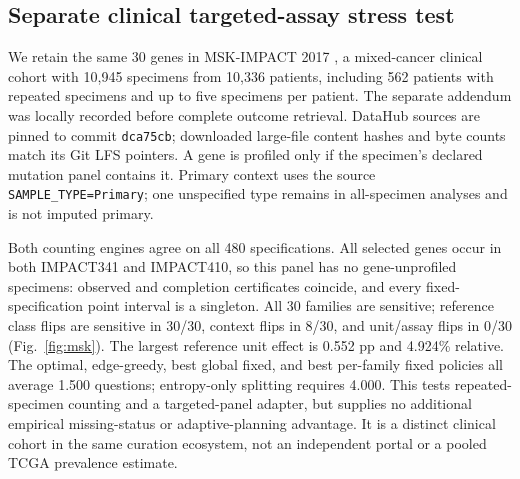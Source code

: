 \subsection{Separate clinical targeted-assay stress test}
We retain the same 30 genes in MSK-IMPACT 2017 \cite{zehir}, a mixed-cancer clinical cohort with 10,945 specimens from 10,336 patients, including 562 patients with repeated specimens and up to five specimens per patient. The separate addendum was locally recorded before complete outcome retrieval. DataHub sources are pinned to commit \texttt{dca75cb}; downloaded large-file content hashes and byte counts match its Git LFS pointers. A gene is profiled only if the specimen's declared mutation panel contains it. Primary context uses the source \texttt{SAMPLE\_TYPE=Primary}; one unspecified type remains in all-specimen analyses and is not imputed primary.

Both counting engines agree on all 480 specifications. All selected genes occur in both IMPACT341 and IMPACT410, so this panel has no gene-unprofiled specimens: observed and completion certificates coincide, and every fixed-specification point interval is a singleton. All 30 families are sensitive; reference class flips are sensitive in 30/30, context flips in 8/30, and unit/assay flips in 0/30 (Fig.~\ref{fig:msk}). The largest reference unit effect is 0.552 pp and 4.924\% relative. The optimal, edge-greedy, best global fixed, and best per-family fixed policies all average 1.500 questions; entropy-only splitting requires 4.000. This tests repeated-specimen counting and a targeted-panel adapter, but supplies no additional empirical missing-status or adaptive-planning advantage. It is a distinct clinical cohort in the same curation ecosystem, not an independent portal or a pooled TCGA prevalence estimate.

